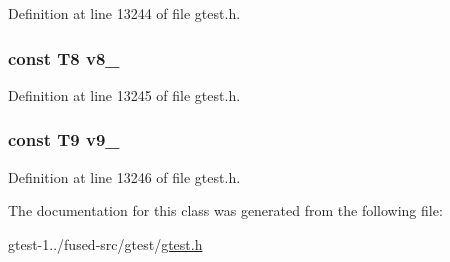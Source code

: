 \-Definition at line 13244 of file gtest.\-h.

\hypertarget{classtesting_1_1internal_1_1ValueArray49_a596bc5260b2474271d1f6910ff6f665d}{
\subsubsection[{v8\-\_\-}]{\setlength{\rightskip}{0pt plus 5cm}const \-T8 {\bf v8\-\_\-}}}\label{dc/dd7/classtesting_1_1internal_1_1ValueArray49_a596bc5260b2474271d1f6910ff6f665d}


\-Definition at line 13245 of file gtest.\-h.

\hypertarget{classtesting_1_1internal_1_1ValueArray49_a6356e16cf54a9dfac8525f20242af31e}{
\subsubsection[{v9\-\_\-}]{\setlength{\rightskip}{0pt plus 5cm}const \-T9 {\bf v9\-\_\-}}}\label{dc/dd7/classtesting_1_1internal_1_1ValueArray49_a6356e16cf54a9dfac8525f20242af31e}


\-Definition at line 13246 of file gtest.\-h.



\-The documentation for this class was generated from the following file\-:\begin{DoxyCompactItemize}
\item 
gtest-\/1../fused-\/src/gtest/\hyperlink{fused-src_2gtest_2gtest_8h}{gtest.\-h}\end{DoxyCompactItemize}

